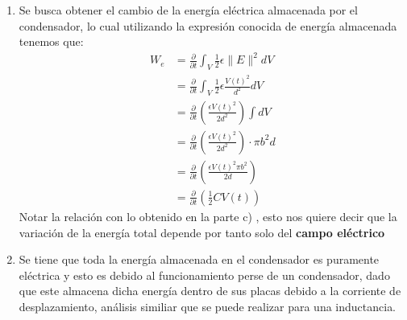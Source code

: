 \documentclass[
  11pt,
  letterpaper,
   addpoints,
   answers
  ]{exam}
\begin{document}
\begin{questions}
\begin{solution}
\begin{enumerate}
\begin{align}
                &=  -\frac{\epsilon \pi b^{2}}{d}V(t) \left(\frac{\partial V(t)}{\partial t}\right)(-\hat{\theta})\\
                &= \frac{1}{2} \frac{\epsilon b^{2} \pi}{ d} \cdot \frac{\partial (V(t))^{2}}{\partial t}(\hat{\theta})\\
                &= \frac{\partial}{\partial t} \left( \frac{1}{2} CV^{2}\right)(\hat{\theta})
            \end{align}
            (Se utilizo que  $V(t) \left(\frac{\partial V(t)}{\partial t}\right)  = \frac{\partial}{\partial t} (\frac{1}{2} V(t)^{2})$). Finalmente se observa que depende solo de la variación de la energía eléctrica almacenada, lo cual concuerda de buena manera con el hecho de que estamos trabajando con un condensador.\item Se busca obtener el cambio de la energía eléctrica almacenada por el condensador, lo cual utilizando la expresión conocida de energía almacenada tenemos que:
            \begin{align}
                W_{e} &= \frac{\partial}{\partial t} \int_{V} \frac{1}{2} \epsilon \|E\|^{2} dV\\
                      &= \frac{\partial}{\partial t} \int_{V} \frac{1}{2} \epsilon \frac{V(t)^{2}}{d^{2}} dV\\
                      &= \frac{\partial}{\partial t} \left( \frac{\epsilon V(t) ^{2}}{2d^{2}}\right) \int dV\\
                      &= \frac{\partial}{\partial t} \left( \frac{\epsilon V(t) ^{2}}{2d^{2}}\right) \cdot \pi b^{2} d\\
                      &= \frac{\partial}{\partial t} \left(\frac{\epsilon V(t)^{2} \pi b^{2}}{2d}\right)\\
                      &= \frac{\partial}{\partial t} \left( \frac{1}{2} CV(t)\right)
            \end{align}
            Notar la relación con lo obtenido en la parte c) , esto nos quiere decir que la variación de la energía total depende por tanto solo del \textbf{campo eléctrico}
            \item Se tiene que toda la energía almacenada en el condensador es puramente eléctrica y esto es debido al funcionamiento perse de un condensador, dado que este almacena dicha energía dentro de sus placas debido a la corriente de desplazamiento, análisis similiar que se puede realizar para una inductancia.
         \end{enumerate}
    \end{solution}

\end{questions}
\end{document}
